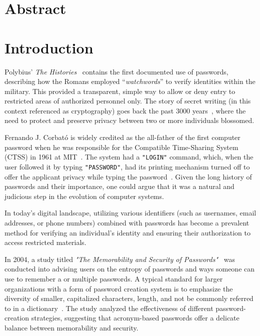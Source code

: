 \documentclass{article}
\begin{document}
    \fi

    \section*{Abstract}

    \section*{Introduction}
    Polybius' \textit{The Histories}~\cite{perseus_tufts} contains the first documented use of passwords, describing how
    the Romans employed ``\textit{watchwords}'' to verify identities within the military.
    This provided a transparent, simple way to allow or deny entry to restricted areas of authorized personnel only.
    The story of secret writing (in this context referenced as cryptography) goes back the past 3000 years~\cite{history_cryptography_cryptanalysis},
    where the need to protect and preserve privacy between two or more individuals blossomed.

    Fernando J. Corbató is widely credited as the all-father of the first computer password when he was responsible for
    the Compatible Time-Sharing System (CTSS) in 1961 at MIT~\cite{levy1984hackers}.
    The system had a \texttt{"LOGIN"} command, which, when the user followed it by typing \texttt{"PASSWORD"},
    had its printing mechanism turned off to offer the applicant privacy while typing the password~\cite{ctss_programmers_guide}.
    Given the long history of passwords and their importance, one could argue that it was a natural and judicious
    step in the evolution of computer systems.

    In today's digital landscape, utilizing various identifiers (such as usernames, email addresses, or phone numbers)
    combined with passwords has become a prevalent method for verifying an individual's identity and ensuring
    their authorization to access restricted materials.

    In 2004, a study titled \textit{"The Memorability and Security of Passwords"}~\cite{yan2000password} was conducted into
    advising users on the entropy of passwords and ways someone can use to remember a or multiple passwords.
    A typical standard for larger organizations with a form of password creation system is to emphasize the diversity of
    smaller, capitalized characters, length, and not be commonly referred to in a dictionary~\cite{yan2000password}.
    The study analyzed the effectiveness of different password-creation strategies, suggesting that acronym-based
    passwords offer a delicate balance between memorability and security.
\end{document}
